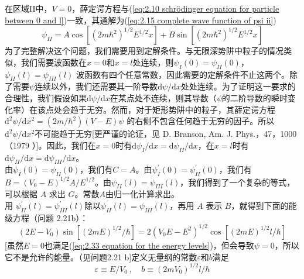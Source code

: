 	\indent 在区域II中，$V=0$，薛定谔方程与(\ref{eq:2.10 schrödinger equation for particle between 0 and l})一致，其通解为(\ref{eq:2.15 complete wave function of psi ii})
	\begin{equation}
		\psi_{II} = A \cos\left[\left(2m\hbar^2\right)^{1/2}E^{1/2}x\right]+B\sin \left[\left(2m\hbar^2\right)^{1/2}E^{1/2}x\right]
		\label{eq:2.32}
	\end{equation}
	\indent 为了完整解决这个问题，我们需要用到定解条件。与无限深势阱中粒子的情况类似，我们需要波函数在$x=0$和$x=l$处连续，则$\psi_I\left(0\right) = \psi_{II}\left(0\right)$，$\psi_{II}\left(l\right) = \psi_{III}\left(l\right)$
	波函数有四个任意常数，因此需要的定解条件不止这两个。除了需要$\psi$连续以外，我们还需要其一阶导数$\mathrm{d}\psi/\mathrm{d}x$处处连续。为了证明这一要求的合理性，我们假设如果$\mathrm{d}\psi/\mathrm{d}x$在某点处不连续，则其导数（$\psi$的二阶导数的瞬时变化率）在该点处会趋于无穷。然而，对于矩形势阱中的粒子，其薛定谔方程$\mathrm{d}^2\psi/\mathrm{d}x^2=\left(2m/\hbar^2\right)\left(V-E\right)\psi$
	的右侧不包含任何趋于无穷的因子。所以$\mathrm{d}^2\psi/\mathrm{d}x^2$不可能趋于无穷[更严谨的论证，见 D. Branson, Am. J. Phys.，47，1000（1979 ）]。因此，我们在$x=0$时有$\mathrm{d}\psi_I/\mathrm{d}x=\mathrm{d}\psi_{II}/\mathrm{d}x$，在$x=l$时有$\mathrm{d}\psi_{II}/\mathrm{d}x=\mathrm{d}\psi_{III}/\mathrm{d}x$。\\
	\indent 由$\psi_I\left(0\right) = \psi_{II}\left(0\right)$，我们有$C=A$。由$\psi_I^{\prime}\left(0\right) = \psi_{II}^{\prime}\left(0\right)$，我们有$B=\left(V_0-E\right)^{1/2}A/E^{1/2}$。由$\psi_{II}\left(l\right) = \psi_{III}\left(l\right)$，我们得到了一个复杂的等式，可以根据 $A$ 求出 $G$。常数$A$由归一化计算求出。\\
	\indent 用 $\psi^{\prime}_{II}\left(l\right) = \psi^{\prime}_{III}\left(l\right)$除以$\psi_{II}\left(l\right) = \psi_{III}\left(l\right)$，再用 $A$ 表示 $B$，就得到下面的能级方程（问题 2.21b）：
	\begin{equation}
		\left(2E-V_0\right)\sin\left[\left(2mE\right)^{1/2}/\hbar\right] = 2\left(V_0E-E^2\right)^{1/2}\cos \left[\left(2mE\right)^{1/2}l/\hbar\right]
		\label{eq:2.33 equation for the energy levels}
	\end{equation}
	[虽然$E=0$也满足(\ref{eq:2.33 equation for the energy levels})，但会导致$\psi=0$，所以它不是允许的能量。（见问题2.21 b]定义无量纲的常数$\varepsilon$和$b$满足
	\begin{equation}
		\varepsilon \equiv E/V_0\:, \quad b \equiv \left(2mV_0\right)^{1/2}l/\hbar
		\label{eq: 2.34 definition of varepsilon and b}
	\end{equation}
